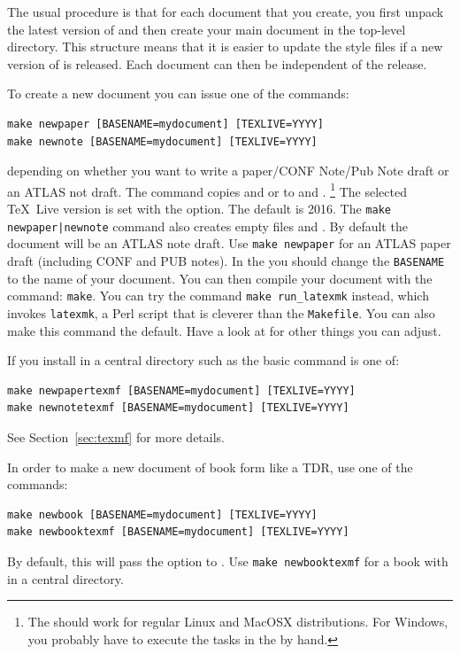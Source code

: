 The usual procedure is that for each document that you create,
you first unpack the latest version of  and
then create your main document in the top-level directory.
This structure means that it is easier to update the style files if a new version of
 is released. 
Each document can then be independent of the  release.

To create a new document you can issue one of the commands:
%
\begin{verbatim}
make newpaper [BASENAME=mydocument] [TEXLIVE=YYYY]
make newnote [BASENAME=mydocument] [TEXLIVE=YYYY]
\end{verbatim}
depending on whether you want to write a paper/CONF Note/Pub Note draft or
an ATLAS not draft.
%
The command copies  and
 or 
to  and .%
\footnote{The  should work for regular Linux and MacOSX distributions.
  For Windows, you probably have to execute the tasks in the  by hand.}
The selected \TeX\ Live version is set with the  option. The default is 2016.
The \texttt{make newpaper|newnote} command also creates empty files  and .
By default the document will be an ATLAS note draft.
Use \texttt{make newpaper} for an ATLAS paper draft (including CONF and PUB notes).
In the  you should change the \texttt{BASENAME} to the name of your document.
You can then compile your document with the command: \texttt{make}.
You can try the command \texttt{make run\_latexmk} instead,
which invokes \texttt{latexmk}, a Perl script that is cleverer than the \texttt{Makefile}.
You can also make this command the default.
Have a look at  for other things you can adjust.

If you install  in a central directory such as  the basic command is one of:
%
\begin{verbatim}
make newpapertexmf [BASENAME=mydocument] [TEXLIVE=YYYY]
make newnotetexmf [BASENAME=mydocument] [TEXLIVE=YYYY]
\end{verbatim}
%
See Section~\ref{sec:texmf} for more details.

In order to make a new document of book form like a TDR, use one of the commands:
%
\begin{verbatim}
make newbook [BASENAME=mydocument] [TEXLIVE=YYYY]
make newbooktexmf [BASENAME=mydocument] [TEXLIVE=YYYY]
\end{verbatim}
%
By default, this will pass the option  to .
Use \verb|make newbooktexmf| for a book with  in a central directory.

